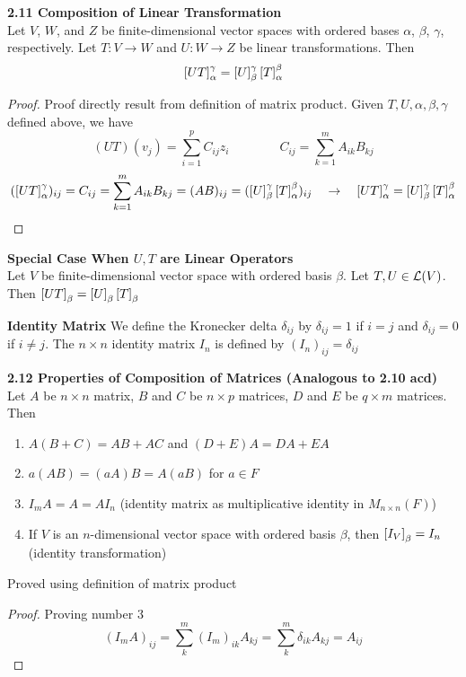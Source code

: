 \documentclass[11pt]{article}
\begin{document}
\begin{theorem*}
    \textbf{2.11 Composition of Linear Transformation} \\
    Let $V$, $W$, and $Z$ be finite-dimensional vector spaces with ordered bases $\alpha$, $\beta$, $\gamma$, respectively. Let $T:V\to W$ and $U:W\to Z$ be linear transformations. Then 
    \[
        \left[ UT \right]_{\alpha}^{\gamma} = \left[ U \right]_{\beta}^{\gamma} \left[ T \right]_{\alpha}^{\beta}
    \]
    \begin{proof}
        Proof directly result from definition of matrix product. Given $T,U, \alpha,\beta,\gamma$ defined above, we have 
        \[
            (UT)(v_j) = \sum_{i=1}^p C_{ij} z_i \quad \quad \quad \quad 
            C_{ij} = \sum_{k=1}^m A_{ik} B_{kj}
        \]
        \[
            (\left[ UT \right]_{\alpha}^{\gamma})_{ij} = C_{ij} = 
            \sum_{k=1}^m A_{ik} B_{kj} = (AB)_{ij} = (\left[ U \right]_{\beta}^{\gamma}\left[ T \right]_{\alpha}^{\beta})_{ij}
            \quad \rightarrow \quad 
            \left[ UT \right]_{\alpha}^{\gamma} = \left[ U \right]_{\beta}^{\gamma} \left[ T \right]_{\alpha}^{\beta}
        \]
    \end{proof}
\end{theorem*}


\begin{corollary*}
    \textbf{Special Case When $U,T$ are Linear Operators} \\
    Let $V$ be finite-dimensional vector space with ordered basis $\beta$. Let $T,U\in \mathcal{L}(V)$. Then $\left[ UT \right]_{\beta} = \left[ U \right]_{\beta} \left[ T \right]_{\beta}$
\end{corollary*}

\begin{defn*}
    \textbf{Identity Matrix} We define the Kronecker delta $\delta_{ij}$ by $\delta_{ij}=1$ if $i=j$ and $\delta_{ij}=0$ if $i\neq j$. The $n\times n$ identity matrix $I_n$ is defined by $(I_n)_{ij} = \delta_{ij}$
\end{defn*}

\begin{theorem*}
    \textbf{2.12 Properties of Composition of Matrices (Analogous to 2.10 acd)} \\
    Let $A$ be $n\times n$ matrix, $B$ and $C$ be $n\times p$ matrices, $D$ and $E$ be $q\times m$ matrices. Then 
    \begin{enumerate}
        \item $A(B+C)=AB+AC$ and $(D+E)A = DA+EA$
        \item $a(AB) = (aA)B = A(aB)$ for $a\in F$
        \item $I_m A = A = AI_n$ (identity matrix as multiplicative identity in $M_{n\times n}(F)$)
        \item If $V$ is an $n$-dimensional vector space with ordered basis $\beta$, then $\left[ I_V \right]_{\beta} = I_n$ (identity transformation)
    \end{enumerate}
    Proved using definition of matrix product 
    \begin{proof}
        Proving number 3
        \[
            (I_m A)_{ij} = \sum_k^m (I_m)_{ik} A_{kj} = \sum_k^m \delta_{ik} A_{kj} = A_{ij}    
        \]
    \end{proof}
\end{theorem*}
\end{document}
